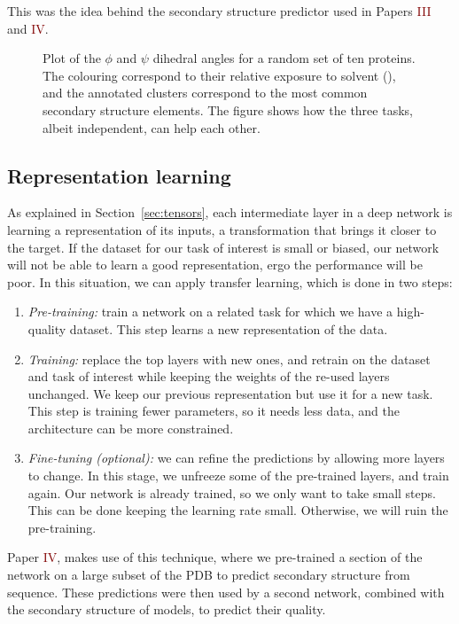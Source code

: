 This was the idea behind the secondary structure predictor used in Papers \textcolor{Maroon}{III} and \textcolor{Maroon}{IV}.

\begin{figure}[bht]
\centering
\caption{Plot of the $\phi$ and $\psi$ dihedral angles for a random set of ten proteins.
The colouring correspond to their relative exposure to solvent (\RSA),
and the annotated clusters correspond to the most common secondary structure elements.
The figure shows how the three tasks, albeit independent, can help each other. }\label{fig:transfer_learning}
\end{figure}

\subsection{Representation learning}
As explained in Section~\ref{sec:tensors}, each intermediate layer in a deep network is learning a representation of its inputs, a transformation that brings it closer to the target.
If the dataset for our task of interest is small or biased, our network will not be able to learn a good representation, ergo the performance will be poor.
In this situation, we can apply transfer learning, which is done in two steps:
\begin{enumerate}
\item \emph{Pre-training:} train a network on a related task for which we have a high-quality dataset.
This step learns a new representation of the data.
\item \emph{Training:} replace the top layers with new ones, and retrain on the dataset and task of interest while keeping the weights of the re-used layers unchanged.
We keep our previous representation but use it for a new task.
This step is training fewer parameters, so it needs less data, and the architecture can be more constrained.
\item \emph{Fine-tuning (optional):} we can refine the predictions by allowing more layers to change.
In this stage, we unfreeze some of the pre-trained layers, and train again.
Our network is already trained, so we only want to take small steps.
This can be done keeping the learning rate small. Otherwise, we will ruin the pre-training.
\end{enumerate}

Paper \textcolor{Maroon}{IV}, makes use of this technique, where we pre-trained a section of the network on a large subset of the PDB to predict secondary structure from sequence.
These predictions were then used by a second network, combined with the secondary structure of models, to predict their quality.

